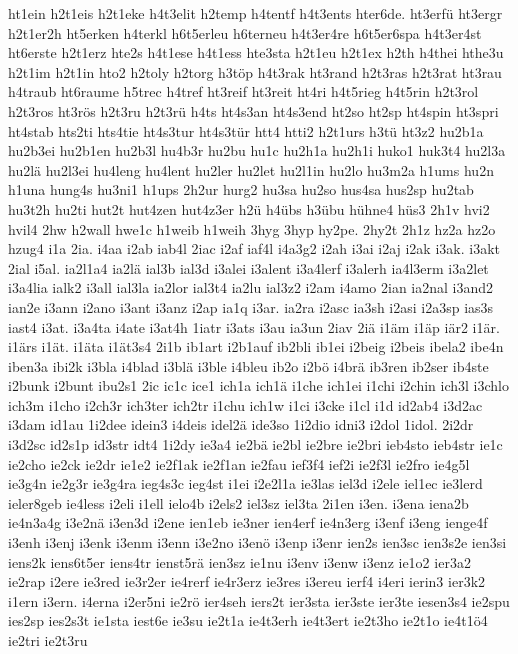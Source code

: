 {ht1ein
h2t1eis
h2t1eke
h4t3elit
h2temp
h4tentf
h4t3ents
hter6de.
ht3erfü
ht3ergr
h2t1er2h
ht5erken
h4terkl
h6t5erleu
h6terneu
h4t3er4re
h6t5er6spa
h4t3er4st
ht6erste
h2t1erz
hte2s
h4t1ese
h4t1ess
hte3sta
h2t1eu
h2t1ex
h2th
h4thei
hthe3u
h2t1im
h2t1in
hto2
h2toly
h2torg
h3töp
h4t3rak
ht3rand
h2t3ras
h2t3rat
ht3rau
h4traub
ht6raume
h5trec
h4tref
ht3reif
ht3reit
ht4ri
h4t5rieg
h4t5rin
h2t3rol
h2t3ros
ht3rös
h2t3ru
h2t3rü
h4ts
ht4s3an
ht4s3end
ht2so
ht2sp
ht4spin
ht3spri
ht4stab
hts2ti
hts4tie
ht4s3tur
ht4s3tür
htt4
htti2
h2t1urs
h3tü
ht3z2
hu2b1a
hu2b3ei
hu2b1en
hu2b3l
hu4b3r
hu2bu
hu1c
hu2h1a
hu2h1i
huko1
huk3t4
hu2l3a
hu2lä
hu2l3ei
hu4leng
hu4lent
hu2ler
hu2let
hu2l1in
hu2lo
hu3m2a
h1ums
hu2n
h1una
hung4s
hu3ni1
h1ups
2h2ur
hurg2
hu3sa
hu2so
hus4sa
hus2sp
hu2tab
hu3t2h
hu2ti
hut2t
hut4zen
hut4z3er
h2ü
h4übs
h3übu
hühne4
hüs3
2h1v
hvi2
hvil4
2hw
h2wall
hwe1c
h1weib
h1weih
3hyg
3hyp
hy2pe.
2hy2t
2h1z
hz2a
hz2o
hzug4
i1a
2ia.
i4aa
i2ab
iab4l
2iac
i2af
iaf4l
i4a3g2
i2ah
i3ai
i2aj
i2ak
i3ak.
i3akt
2ial
i5al.
ia2l1a4
ia2lä
ial3b
ial3d
i3alei
i3alent
i3a4lerf
i3alerh
ia4l3erm
i3a2let
i3a4lia
ialk2
i3all
ial3la
ia2lor
ial3t4
ia2lu
ial3z2
i2am
i4amo
2ian
ia2nal
i3and2
ian2e
i3ann
i2ano
i3ant
i3anz
i2ap
ia1q
i3ar.
ia2ra
i2asc
ia3sh
i2asi
i2a3sp
ias3s
iast4
i3at.
i3a4ta
i4ate
i3at4h
1iatr
i3ats
i3au
ia3un
2iav
2iä
i1äm
i1äp
iär2
i1är.
i1ärs
i1ät.
i1äta
i1ät3s4
2i1b
ib1art
i2b1auf
ib2bli
ib1ei
i2beig
i2beis
ibela2
ibe4n
iben3a
ibi2k
i3bla
i4blad
i3blä
i3ble
i4bleu
ib2o
i2bö
i4brä
ib3ren
ib2ser
ib4ste
i2bunk
i2bunt
ibu2s1
2ic
ic1c
ice1
ich1a
ich1ä
i1che
ich1ei
i1chi
i2chin
ich3l
i3chlo
ich3m
i1cho
i2ch3r
ich3ter
ich2tr
i1chu
ich1w
i1ci
i3cke
i1cl
i1d
id2ab4
i3d2ac
i3dam
id1au
1i2dee
idein3
i4deis
idel2ä
ide3so
1i2dio
idni3
i2dol
1idol.
2i2dr
i3d2sc
id2s1p
id3str
idt4
1i2dy
ie3a4
ie2bä
ie2bl
ie2bre
ie2bri
ieb4sto
ieb4str
ie1c
ie2cho
ie2ck
ie2dr
ie1e2
ie2f1ak
ie2f1an
ie2fau
ief3f4
ief2i
ie2f3l
ie2fro
ie4g5l
ie3g4n
ie2g3r
ie3g4ra
ieg4s3c
ieg4st
i1ei
i2e2l1a
ie3las
iel3d
i2ele
iel1ec
ie3lerd
ieler8geb
ie4less
i2eli
i1ell
ielo4b
i2els2
iel3sz
iel3ta
2i1en
i3en.
i3ena
iena2b
ie4n3a4g
i3e2nä
i3en3d
i2ene
ien1eb
ie3ner
ien4erf
ie4n3erg
i3enf
i3eng
ienge4f
i3enh
i3enj
i3enk
i3enm
i3enn
i3e2no
i3enö
i3enp
i3enr
ien2s
ien3sc
ien3s2e
ien3si
iens2k
iens6t5er
iens4tr
ienst5rä
ien3sz
ie1nu
i3env
i3enw
i3enz
ie1o2
ier3a2
ie2rap
i2ere
ie3red
ie3r2er
ie4rerf
ie4r3erz
ie3res
i3ereu
ierf4
i4eri
ierin3
ier3k2
i1ern
i3ern.
i4erna
i2er5ni
ie2rö
ier4seh
iers2t
ier3sta
ier3ste
ier3te
iesen3s4
ie2spu
ies2sp
ies2s3t
ie1sta
iest6e
ie3su
ie2t1a
ie4t3erh
ie4t3ert
ie2t3ho
ie2t1o
ie4t1ö4
ie2tri
ie2t3ru
}
